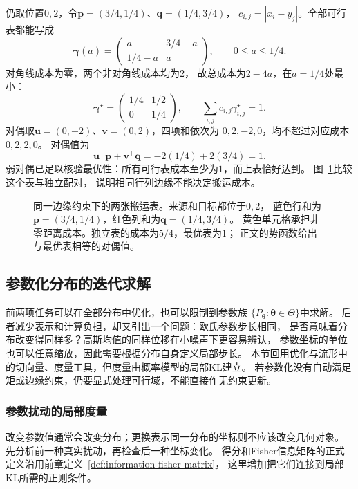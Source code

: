 仍取位置\(0,2\)，令\(\bm p=(3/4,1/4)\)、\(\bm q=(1/4,3/4)\)，
\(c_{i,j}=|x_i-y_j|\)。全部可行表都能写成
\[
  \bm\gamma(a)=
  \begin{pmatrix}
    a&3/4-a\\
    1/4-a&a
  \end{pmatrix},\qquad 0\leq a\leq1/4.
\]
对角线成本为零，两个非对角线成本均为\(2\)，
故总成本为\(2-4a\)，在\(a=1/4\)处最小：
\[
  \bm\gamma^\star=
  \begin{pmatrix}1/4&1/2\\0&1/4\end{pmatrix},\qquad
  \sum_{i,j}c_{i,j}\gamma^\star_{i,j}=1.
\]
对偶取\(\bm u=(0,-2)\)、\(\bm v=(0,2)\)，四项和依次为
\(0,2,-2,0\)，均不超过对应成本\(0,2,2,0\)。
对偶值为
\[
  \bm u^\top\bm p+\bm v^\top\bm q
  =-2(1/4)+2(3/4)=1.
\]
弱对偶已足以核验最优性：所有可行表成本至少为\(1\)，而上表恰好达到。
图~\ref{fig:information-transport-tables}比较这个表与独立配对，
说明相同行列边缘不能决定搬运成本。
\begin{figure}[htbp]
  \centering
  
  \caption{同一边缘约束下的两张搬运表。来源和目标都位于\(0,2\)，
  蓝色行和为\(\bm p=(3/4,1/4)\)，红色列和为\(\bm q=(1/4,3/4)\)。
  黄色单元格承担非零距离成本。独立表的成本为\(5/4\)，最优表为\(1\)；
  正文的势函数给出与最优表相等的对偶值。}
  \label{fig:information-transport-tables}
\end{figure}

\subsection{参数化分布的迭代求解}
\label{sec:information-global-local-geometry}
\label{sec:information-fisher-geometry}

前两项任务可以在全部分布中优化，也可以限制到参数族
\(\{P_{\bm\theta}:\bm\theta\in\Theta\}\)中求解。
后者减少表示和计算负担，却又引出一个问题：欧氏参数步长相同，
是否意味着分布改变得同样多？高斯均值的同样位移在小噪声下更容易辨认，
参数坐标的单位也可以任意缩放，因此需要根据分布自身定义局部步长。
本节回用优化与流形中的切向量、度量工具，但度量由概率模型的局部KL建立。
若参数化没有自动满足矩或边缘约束，仍要显式处理可行域，不能直接作无约束更新。

\subsubsection{参数扰动的局部度量}
\label{sec:information-local-metric}

改变参数值通常会改变分布；更换表示同一分布的坐标则不应该改变几何对象。
先分析前一种真实扰动，再检查后一种坐标变化。
得分和Fisher信息矩阵的正式定义沿用前章定义~\ref{def:information-fisher-matrix}，
这里增加把它们连接到局部KL所需的正则条件。

